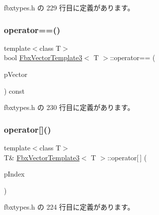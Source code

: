  fbxtypes.\+h の 229 行目に定義があります。

\mbox{\label{class_fbx_vector_template3_aed608afc6dbe8e27447be99120546582}} 
\subsubsection{\texorpdfstring{operator==()}{operator==()}}
{\footnotesize\ttfamily template$<$class T$>$ \\
bool \hyperlink{class_fbx_vector_template3}{Fbx\+Vector\+Template3}$<$ T $>$\+::operator== (\begin{DoxyParamCaption}\item[{const \hyperlink{class_fbx_vector_template3}{Fbx\+Vector\+Template3}$<$ T $>$ \&}]{p\+Vector }\end{DoxyParamCaption}) const\hspace{0.3cm}{\ttfamily [inline]}}



 fbxtypes.\+h の 230 行目に定義があります。

\mbox{\label{class_fbx_vector_template3_a8bf2926bdd00fd0322f826a572eb516d}} 
\subsubsection{\texorpdfstring{operator[]()}{operator[]()}\hspace{0.1cm}{\footnotesize\ttfamily [1/2]}}
{\footnotesize\ttfamily template$<$class T$>$ \\
T\& \hyperlink{class_fbx_vector_template3}{Fbx\+Vector\+Template3}$<$ T $>$\+::operator\mbox{[}$\,$\mbox{]} (\begin{DoxyParamCaption}\item[{int}]{p\+Index }\end{DoxyParamCaption})\hspace{0.3cm}{\ttfamily [inline]}}



 fbxtypes.\+h の 224 行目に定義があります。

\mbox{\label{class_fbx_vector_template3_a54b2f30b8fd0d4b32bf6df936682d5f0}} 
